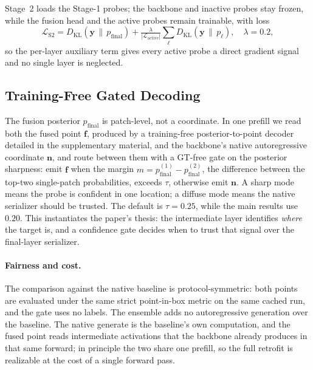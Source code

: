 Stage~2 loads the Stage-1 probes; the backbone and inactive probes stay frozen, while the fusion head and the active probes remain trainable, with loss
\begin{equation}
  \mathcal{L}_{\mathrm{S2}} = D_{\mathrm{KL}}(\mathbf{y}\,\|\,p_{\mathrm{final}}) + \tfrac{\lambda}{|\mathcal{L}_{\mathrm{active}}|}\sum_\ell D_{\mathrm{KL}}(\mathbf{y}\,\|\,p_\ell),\quad \lambda=0.2,
  \label{eq:loss_s2}
\end{equation}
so the per-layer auxiliary term gives every active probe a direct gradient signal and no single layer is neglected.

\subsection{Training-Free Gated Decoding}
\label{sec:method:ensemble}

The fusion posterior $p_{\mathrm{final}}$ is patch-level, not a coordinate. In one prefill we read both the fused point $\mathbf{f}$, produced by a training-free posterior-to-point decoder detailed in the supplementary material, and the backbone's native autoregressive coordinate $\mathbf{n}$, and route between them with a GT-free gate on the posterior sharpness: emit $\mathbf{f}$ when the margin $m=p_{\mathrm{final}}^{(1)}-p_{\mathrm{final}}^{(2)}$, the difference between the top-two single-patch probabilities, exceeds $\tau$, otherwise emit $\mathbf{n}$. A sharp mode means the probe is confident in one location; a diffuse mode means the native serializer should be trusted. The default is $\tau{=}0.25$, while the main results use $0.20$. This instantiates the paper's thesis: the intermediate layer identifies \emph{where} the target is, and a confidence gate decides when to trust that signal over the final-layer serializer.

\paragraph{Fairness and cost.}
The comparison against the native baseline is protocol-symmetric: both points are evaluated under the same strict point-in-box metric on the same cached run, and the gate uses no labels. The ensemble adds no autoregressive generation over the baseline. The native generate is the baseline's own computation, and the fused point reads intermediate activations that the backbone already produces in that same forward; in principle the two share one prefill, so the full retrofit is realizable at the cost of a single forward pass.
